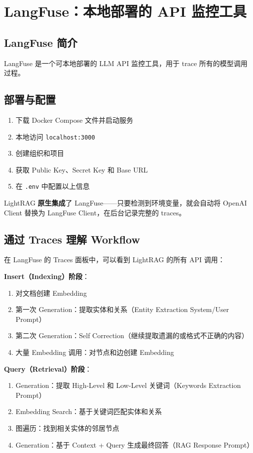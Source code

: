 \section{LangFuse：本地部署的 API 监控工具}

\subsection{LangFuse 简介}

LangFuse 是一个可本地部署的 LLM API 监控工具，用于 trace 所有的模型调用过程。

\subsection{部署与配置}

\begin{enumerate}
    \item 下载 Docker Compose 文件并启动服务
    \item 本地访问 \texttt{localhost:3000}
    \item 创建组织和项目
    \item 获取 Public Key、Secret Key 和 Base URL
    \item 在 \texttt{.env} 中配置以上信息
\end{enumerate}

LightRAG \textbf{原生集成}了 LangFuse——只要检测到环境变量，就会自动将 OpenAI Client 替换为 LangFuse Client，在后台记录完整的 traces。

\subsection{通过 Traces 理解 Workflow}

在 LangFuse 的 Traces 面板中，可以看到 LightRAG 的所有 API 调用：

\textbf{Insert（Indexing）阶段}：
\begin{enumerate}
    \item 对文档创建 Embedding
    \item 第一次 Generation：提取实体和关系（Entity Extraction System/User Prompt）
    \item 第二次 Generation：Self Correction（继续提取遗漏的或格式不正确的内容）
    \item 大量 Embedding 调用：对节点和边创建 Embedding
\end{enumerate}

\textbf{Query（Retrieval）阶段}：
\begin{enumerate}
    \item Generation：提取 High-Level 和 Low-Level 关键词（Keywords Extraction Prompt）
    \item Embedding Search：基于关键词匹配实体和关系
    \item 图遍历：找到相关实体的邻居节点
    \item Generation：基于 Context + Query 生成最终回答（RAG Response Prompt）
\end{enumerate}

